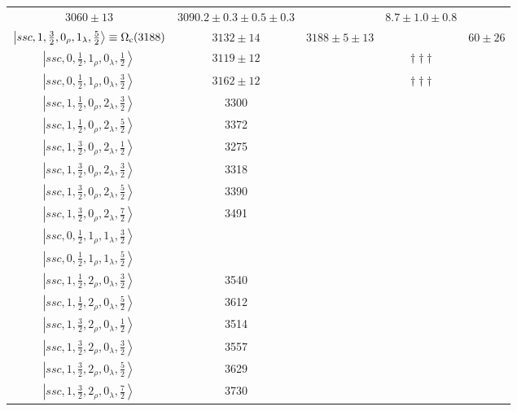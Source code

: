 \documentclass[twocolumn,superscriptaddress,preprintnumbers,nofootinbib]{revtex4}
\begin{document}
\begin{table*}[htbp]
\begin{tabular}{ccccc}
 $3060\pm13$ & $3090.2\pm0.3\pm0.5\pm0.3$ &  & $8.7\pm1.0\pm0.8$ \\
$\left| ssc,1, \frac{3}{2},0_{\rho},1_{\lambda}, \frac{5}{2} \right\rangle  \equiv \Omega_{\rm c}(3188)$  & 
$3132 \pm14$ &  $3188\pm5\pm13$ &   & $60\pm26$   \\
 $\left| ssc,0, \frac{1}{2},1_{\rho},0_{\lambda}, \frac{1}{2} \right\rangle  $ &  $3119 \pm 12$ &  & $\dagger \dagger \dagger $ &  \\
  $\left| ssc,0, \frac{1}{2},1_{\rho},0_{\lambda}, \frac{3}{2} \right\rangle $ & $3162 \pm 12$ &  & $\dagger \dagger \dagger $ &  \\
 $\left| ssc,1, \frac{1}{2},0_{\rho},2_{\lambda}, \frac{3}{2} \right\rangle  $&3300 & & &  \\
$\left| ssc,1, \frac{1}{2},0_{\rho},2_{\lambda}, \frac{5}{2} \right\rangle  $& 3372& & &  \\
 $\left| ssc,1, \frac{3}{2},0_{\rho},2_{\lambda}, \frac{1}{2} \right\rangle  $&3275 & & &  \\
 $\left| ssc,1, \frac{3}{2},0_{\rho},2_{\lambda}, \frac{3}{2} \right\rangle  $&3318 & & &  \\
 $\left| ssc,1, \frac{3}{2},0_{\rho},2_{\lambda}, \frac{5}{2} \right\rangle  $&3390 & & &  \\
 $\left| ssc,1, \frac{3}{2},0_{\rho},2_{\lambda}, \frac{7}{2} \right\rangle  $& 3491& & &  \\
$\left| ssc,0, \frac{1}{2},1_{\rho},1_{\lambda}, \frac{3}{2} \right\rangle  $&& & &  \\
$\left| ssc,0, \frac{1}{2},1_{\rho},1_{\lambda}, \frac{5}{2} \right\rangle  $& & & &  \\
$\left| ssc,1, \frac{1}{2},2_{\rho},0_{\lambda}, \frac{3}{2} \right\rangle  $&3540 & & &  \\
$\left| ssc,1, \frac{1}{2},2_{\rho},0_{\lambda}, \frac{5}{2} \right\rangle  $&3612 & & &  \\
$\left| ssc,1, \frac{3}{2},2_{\rho},0_{\lambda}, \frac{1}{2} \right\rangle  $&3514 & & &  \\
$\left| ssc,1, \frac{3}{2},2_{\rho},0_{\lambda}, \frac{3}{2} \right\rangle  $&3557& & &  \\
$\left| ssc,1, \frac{3}{2},2_{\rho},0_{\lambda}, \frac{5}{2} \right\rangle  $&3629 & & &  \\
$\left| ssc,1, \frac{3}{2},2_{\rho},0_{\lambda}, \frac{7}{2} \right\rangle  $&3730 & & &  \\
\hline
\hline
\end{tabular}
\label{tab:widthsOmegac}
\end{table*}
\end{document}
